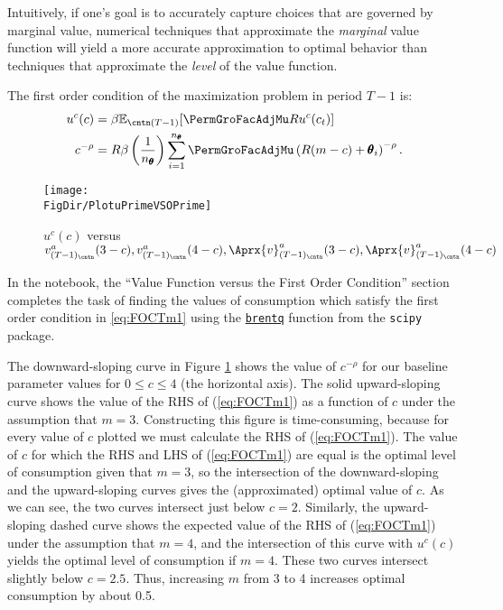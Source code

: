 \documentclass[titlepage, headings=optiontotocandhead]{Resources/texmf-local/tex/latex/econtex}
\begin{document}
Intuitively, if one's goal is to accurately capture choices
that are governed by marginal value,
numerical techniques that approximate the \textit{marginal} value
function will yield a more accurate approximation to
optimal behavior than techniques that approximate the \textit{level}
of the value function.

The first order condition of the maximization problem in period $T-1$ is:
  \begin{equation}\begin{gathered}\begin{aligned}
        u^{c}(c)       & = \beta {\mathbb{E}}_{\cntn(T-1)} [\PermGroFacAdjMu R u^{c}(c_{t})]  %
        \\      c^{-\rho}   & = R \beta \left(\frac{1}{n_{\pmb{\theta}}}\right) \sum_{i=1}^{n_{\pmb{\theta}}} \PermGroFacAdjMu\left(R (m-c) + \pmb{\theta}_{i}\right)^{-\rho} \label{eq:FOCTm1}.
      \end{aligned}\end{gathered}\end{equation}
\hypertarget{PlotuPrimeVSOPrime}{}
\begin{figure}
  \centerline{\texttt{[image: \\FigDir/PlotuPrimeVSOPrime]}}
  \caption{$u^{c}(c)$ versus $v_{({T-1})_\cntn}^{a}(3-c), v_{({T-1})_\cntn}^{a}(4-c), \Aprx{v}_{({T-1})_\cntn}^{a}(3-c), \Aprx{v}_{({T-1})_\cntn}^{a}(4-c)$}
  \label{fig:PlotuPrimeVSOPrime}
\end{figure}

In the notebook, the ``Value Function versus the First Order Condition'' section completes the task of finding the values of consumption which satisfy the first order condition in \eqref{eq:FOCTm1} using the \href{https://docs.scipy.org/doc/scipy/reference/generated/scipy.optimize.brentq.html}{\texttt{brentq}} function from the \texttt{scipy} package.%


The downward-sloping curve in Figure \ref{fig:PlotuPrimeVSOPrime}
shows the value of $c^{-\rho}$ for our baseline parameter values
for $0 \leq c \leq 4$ (the horizontal axis).  The solid
upward-sloping curve shows the value of the RHS of (\ref{eq:FOCTm1})
as a function of $c$ under the assumption that $m=3$.
Constructing this figure is time-consuming, because for every
value of $c$ plotted we must calculate the RHS of
(\ref{eq:FOCTm1}).  The value of $c$ for which the RHS and LHS
of (\ref{eq:FOCTm1}) are equal is the optimal level of consumption
given that $m=3$, so the intersection of the downward-sloping
and the upward-sloping curves gives the (approximated) optimal value of $c$.
As we can see, the two curves intersect just below $c=2$.
Similarly, the upward-sloping dashed curve shows the expected value
of the RHS of (\ref{eq:FOCTm1}) under the assumption that $m=4$,
and the intersection of this curve with $u^{c}(c)$ yields the
optimal level of consumption if $m=4$.  These two curves
intersect slightly below $c=2.5$.  Thus, increasing $m$
from 3 to 4 increases optimal consumption by about 0.5.
\end{document}

